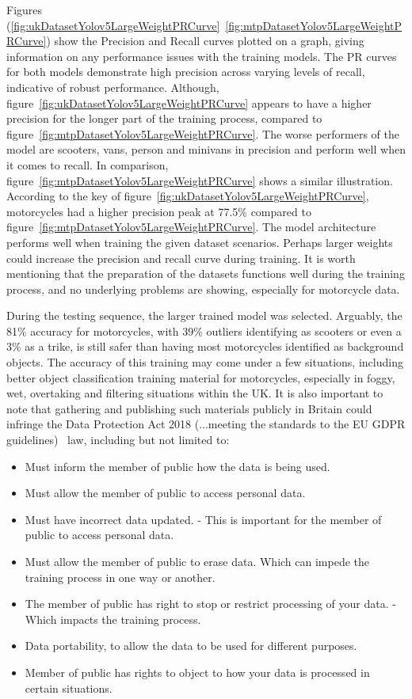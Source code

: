 \documentclass[conference]{IEEEtran}
\begin{document}
    Figures (\ref{fig:ukDatasetYolov5LargeWeightPRCurve}~\ref{fig:mtpDatasetYolov5LargeWeightPRCurve}) show the Precision and Recall curves plotted on a graph, giving information on any performance issues with the training models. The PR curves for both models demonstrate high precision across varying levels of recall, indicative of robust performance. Although, figure~\ref{fig:ukDatasetYolov5LargeWeightPRCurve} appears to have a higher precision for the longer part of the training process, compared to figure~\ref{fig:mtpDatasetYolov5LargeWeightPRCurve}. The worse performers of the model are scooters, vans, person and minivans in precision and perform well when it comes to recall. In comparison, figure~\ref{fig:mtpDatasetYolov5LargeWeightPRCurve} shows a similar illustration. According to the key of figure~\ref{fig:ukDatasetYolov5LargeWeightPRCurve}, motorcycles had a higher precision peak at 77.5\% compared to figure~\ref{fig:mtpDatasetYolov5LargeWeightPRCurve}. The model architecture performs well when training the given dataset scenarios. Perhaps larger weights could increase the precision and recall curve during training. It is worth mentioning that the preparation of the datasets functions well during the training process, and no underlying problems are showing, especially for motorcycle data.

	During the testing sequence, the larger trained model was selected. Arguably, the 81\% accuracy for motorcycles, with 39\% outliers identifying as scooters or even a 3\% as a trike, is still safer than having most motorcycles identified as background objects. The accuracy of this training may come under a few situations, including better object classification training material for motorcycles, especially in foggy, wet, overtaking and filtering situations within the UK. It is also important to note that gathering and publishing such materials publicly in Britain could infringe the Data Protection Act 2018 (...meeting the standards to the EU GDPR guidelines)~\cite{govuk_data_2018} law, including but not limited to:

		\begin{itemize}
			\item Must inform the member of public how the data is being used.
			\item Must allow the member of public to access personal data.
			\item Must have incorrect data updated. - This is important for the member of public to access personal data.
			\item Must allow the member of public to erase data. Which can impede the training process in one way or another.
			\item The member of public has right to stop or restrict processing of your data. - Which impacts the training process.
			\item Data portability, to allow the data to be used for different purposes.
			\item Member of public has rights to object to how your data is processed in certain situations.
		\end{itemize}
\end{document}
